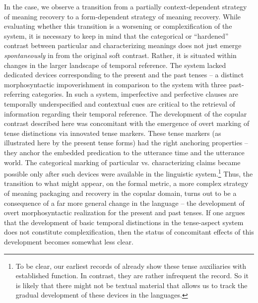 \documentclass[output=paper,hidelinks]{langscibook}
\begin{document}
\begin{exe}
\begin{xlist}
\begin{xlist}
\begin{exe}
\begin{exe}
\begin{exe}
\begin{exe}
\begin{xlist}
\begin{exe}
\begin{xlist}
\begin{exe}
\begin{xlist}
In the  case, we observe a transition from a partially context-de\-pen\-dent strategy of meaning recovery to a form-dependent strategy of meaning recovery. While evaluating whether this transition is a worsening or complexification of the system, it is necessary to keep in mind that the categorical or ``hardened'' contrast between particular and characterizing meanings does not just emerge \textit{spontaneously} in  from the original soft contrast. Rather, it is situated within changes in the larger landscape of  temporal reference. The  system lacked dedicated devices corresponding to the present and the past tenses -- a distinct morphosyntactic impoverishment in comparison to the  system with three past-referring categories. In such a system, imperfective and perfective clauses are temporally underspecified and contextual cues are critical to the retrieval of information regarding their temporal reference. The development of the copular contrast described here was concomitant with the emergence of overt marking of tense distinctions via innovated tense markers. These tense markers (as illustrated here by the present tense forms) had the right anchoring properties -- they anchor the embedded predication to the utterance time and the utterance world. The categorical marking of particular vs. characterizing claims became possible only after such devices were available in the linguistic system.\footnote{To be clear, our earliest records of  already show these tense auxiliaries with established function. In contrast, they are rather infrequent the  record. So it is likely that there might not be textual material that allows us to track the gradual development of these devices in the  languages.} Thus, the transition to what might appear, on the formal metric, a more complex strategy of meaning packaging and recovery in the copular domain, turns out to be a consequence of a far more general change in the language -- the development of overt morphosyntactic realization for the present and past tenses. If one argues that the development of basic temporal distinctions in the tense-aspect system does not constitute complexification, then the status of concomitant effects of this development becomes somewhat less clear.


\end{xlist}
\end{exe}
\end{xlist}
\end{exe}
\end{xlist}
\end{exe}
\end{exe}
\end{exe}
\end{exe}
\end{xlist}
\end{xlist}
\end{exe}
\end{document}
